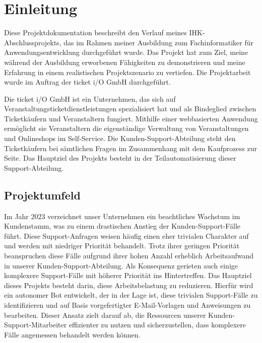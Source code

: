 \section{Einleitung}
\label{sec:Einleitung}
Diese Projektdokumentation beschreibt den Verlauf meines IHK-Abschlussprojekts, 
das im Rahmen meiner Ausbildung zum Fachinformatiker für Anwendungsentwicklung durchgeführt 
wurde. Das Projekt hat zum Ziel, meine während der Ausbildung erworbenen 
Fähigkeiten zu demonstrieren und meine Erfahrung in einem realistischen Projektszenario zu vertiefen.
Die Projektarbeit wurde im Auftrag der ticket i/O GmbH durchgeführt.

Die ticket i/O GmbH ist ein Unternehmen, das sich auf 
Veranstaltungsticketdienstleistungen spezialisiert hat und als 
Bindeglied zwischen Ticketkäufern und Veranstaltern fungiert. 
Mithilfe einer webbasierten Anwendung ermöglicht sie Veranstaltern 
die eigenständige Verwaltung von Veranstaltungen und Onlineshops im Self-Service. 
Die Kunden-Support-Abteilung steht den Ticketkäufern bei sämtlichen 
Fragen im Zusammenhang mit dem Kaufprozess zur Seite. 
Das Hauptziel des Projekts besteht in der Teilautomatisierung dieser Support-Abteilung.

\subsection{Projektumfeld} 
\label{sec:Projektumfeld}
Im Jahr 2023 verzeichnet unser Unternehmen ein
beachtliches Wachstum im Kundenstamm, was zu einem drastischen 
Anstieg der Kunden-Support-Fälle führt. 
Diese Support-Anfragen weisen häufig einen eher trivialen Charakter auf und 
werden mit niedriger Priorität behandelt. Trotz ihrer geringen Priorität
beanspruchen diese Fälle aufgrund ihrer hohen Anzahl erheblich Arbeitsaufwand
in unserer Kunden-Support-Abteilung.
Als Konsequenz gerieten auch einige komplexere 
Support-Fälle mit höherer Priorität ins Hintertreffen.
Das Hauptziel dieses Projekts besteht darin, 
diese Arbeitsbelastung zu reduzieren. Hierfür wird ein autonomer 
Bot entwickelt, der in der Lage ist, 
diese trivialen Support-Fälle zu identifizieren und auf 
Basis vorgefertigter E-Mail-Vorlagen und Anweisungen zu 
bearbeiten. Dieser Ansatz zielt darauf ab, 
die Ressourcen unserer Kunden-Support-Mitarbeiter effizienter zu nutzen und sicherzustellen, dass komplexere Fälle angemessen behandelt werden können.



